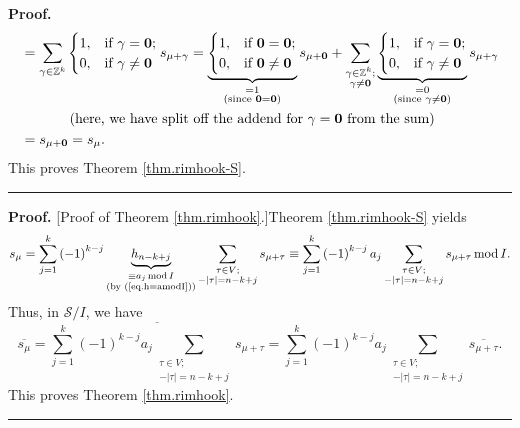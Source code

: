 \documentclass[numbers=enddot,12pt,final,onecolumn,notitlepage]{scrartcl}%
\theoremstyle{definition}
\newenvironment{proof}[1][Proof]{\noindent\textbf{#1.} }{\ \rule{0.5em}{0.5em}}
\let\sumnonlimits\sum
\renewcommand{\sum}{\sumnonlimits\limits}
\begin{document}
\begin{proof}
\begin{align*}
&  =\sum_{\gamma\in\mathbb{Z}^{k}}%
\begin{cases}
1, & \text{if }\gamma=\mathbf{0};\\
0, & \text{if }\gamma\neq\mathbf{0}%
\end{cases}
s_{\mu+\gamma}=\underbrace{%
\begin{cases}
1, & \text{if }\mathbf{0}=\mathbf{0};\\
0, & \text{if }\mathbf{0}\neq\mathbf{0}%
\end{cases}
}_{\substack{=1\\\text{(since }\mathbf{0}=\mathbf{0}\text{)}}}s_{\mu
+\mathbf{0}}+\sum_{\substack{\gamma\in\mathbb{Z}^{k};\\\gamma\neq\mathbf{0}%
}}\underbrace{%
\begin{cases}
1, & \text{if }\gamma=\mathbf{0};\\
0, & \text{if }\gamma\neq\mathbf{0}%
\end{cases}
}_{\substack{=0\\\text{(since }\gamma\neq\mathbf{0}\text{)}}}s_{\mu+\gamma}\\
&  \ \ \ \ \ \ \ \ \ \ \left(  \text{here, we have split off the addend for
}\gamma=\mathbf{0}\text{ from the sum}\right) \\
&  =s_{\mu+\mathbf{0}}=s_{\mu}.
\end{align*}
This proves Theorem \ref{thm.rimhook-S}.
\end{proof}

\begin{proof}
[Proof of Theorem \ref{thm.rimhook}.]Theorem \ref{thm.rimhook-S} yields%
\[
s_{\mu}=\sum_{j=1}^{k}\left(  -1\right)  ^{k-j}\underbrace{h_{n-k+j}%
}_{\substack{\equiv a_{j}\operatorname{mod}I\\\text{(by (\ref{eq.h=amodI}))}%
}}\sum_{\substack{\tau\in V;\\-\left\vert \tau\right\vert =n-k+j}}s_{\mu+\tau
}\equiv\sum_{j=1}^{k}\left(  -1\right)  ^{k-j}a_{j}\sum_{\substack{\tau\in
V;\\-\left\vert \tau\right\vert =n-k+j}}s_{\mu+\tau}\operatorname{mod}I.
\]
Thus, in $\mathcal{S}/I$, we have%
\[
\overline{s_{\mu}}=\overline{\sum_{j=1}^{k}\left(  -1\right)  ^{k-j}a_{j}%
\sum_{\substack{\tau\in V;\\-\left\vert \tau\right\vert =n-k+j}}s_{\mu+\tau}%
}=\sum_{j=1}^{k}\left(  -1\right)  ^{k-j}a_{j}\sum_{\substack{\tau\in
V;\\-\left\vert \tau\right\vert =n-k+j}}\overline{s_{\mu+\tau}}.
\]
This proves Theorem \ref{thm.rimhook}.
\end{proof}
\end{document}
